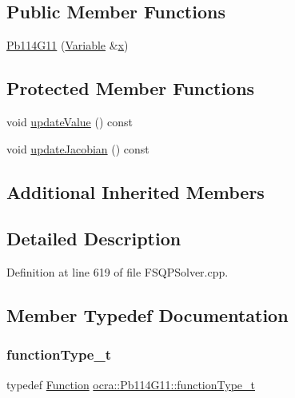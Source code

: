 \subsection*{Public Member Functions}
\begin{DoxyCompactItemize}
\item 
\hyperlink{classocra_1_1Pb114G11_a530be5f34e9ae31c8db6b1a62658dbe6}{Pb114\+G11} (\hyperlink{classocra_1_1Variable}{Variable} \&\hyperlink{classocra_1_1Function_a28825886d1f149c87b112ec2ec1dd486}{x})
\end{DoxyCompactItemize}
\subsection*{Protected Member Functions}
\begin{DoxyCompactItemize}
\item 
void \hyperlink{classocra_1_1Pb114G11_a21e66a9f60492d3c0ff7ed678d39de56}{update\+Value} () const
\item 
void \hyperlink{classocra_1_1Pb114G11_a5dcd54dcc5ef337f78083f676d5d03bb}{update\+Jacobian} () const
\end{DoxyCompactItemize}
\subsection*{Additional Inherited Members}


\subsection{Detailed Description}


Definition at line 619 of file F\+S\+Q\+P\+Solver.\+cpp.



\subsection{Member Typedef Documentation}
\hypertarget{classocra_1_1Pb114G11_a6a78a86715026be7613e399955407e93}{}\label{classocra_1_1Pb114G11_a6a78a86715026be7613e399955407e93} 
\subsubsection{\texorpdfstring{function\+Type\+\_\+t}{functionType\_t}}
{\footnotesize\ttfamily typedef \hyperlink{classocra_1_1Function}{Function} \hyperlink{classocra_1_1Pb114G11_a6a78a86715026be7613e399955407e93}{ocra\+::\+Pb114\+G11\+::function\+Type\+\_\+t}}



